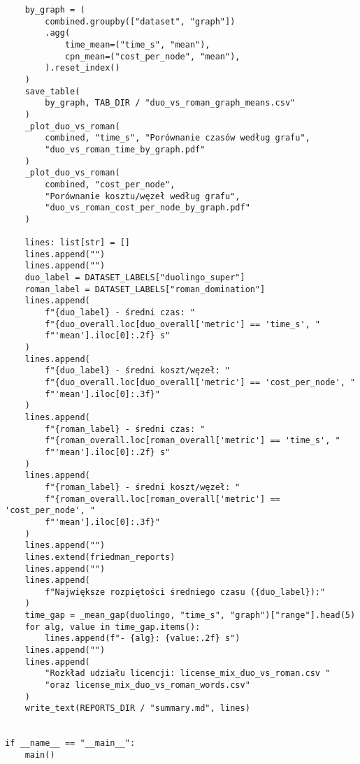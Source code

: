 {\begin{verbatim}
    by_graph = (
        combined.groupby(["dataset", "graph"])
        .agg(
            time_mean=("time_s", "mean"),
            cpn_mean=("cost_per_node", "mean"),
        ).reset_index()
    )
    save_table(
        by_graph, TAB_DIR / "duo_vs_roman_graph_means.csv"
    )
    _plot_duo_vs_roman(
        combined, "time_s", "Porównanie czasów według grafu",
        "duo_vs_roman_time_by_graph.pdf"
    )
    _plot_duo_vs_roman(
        combined, "cost_per_node",
        "Porównanie kosztu/węzeł według grafu",
        "duo_vs_roman_cost_per_node_by_graph.pdf"
    )

    lines: list[str] = []
    lines.append("")
    lines.append("")
    duo_label = DATASET_LABELS["duolingo_super"]
    roman_label = DATASET_LABELS["roman_domination"]
    lines.append(
        f"{duo_label} - średni czas: "
        f"{duo_overall.loc[duo_overall['metric'] == 'time_s', "
        f"'mean'].iloc[0]:.2f} s"
    )
    lines.append(
        f"{duo_label} - średni koszt/węzeł: "
        f"{duo_overall.loc[duo_overall['metric'] == 'cost_per_node', "
        f"'mean'].iloc[0]:.3f}"
    )
    lines.append(
        f"{roman_label} - średni czas: "
        f"{roman_overall.loc[roman_overall['metric'] == 'time_s', "
        f"'mean'].iloc[0]:.2f} s"
    )
    lines.append(
        f"{roman_label} - średni koszt/węzeł: "
        f"{roman_overall.loc[roman_overall['metric'] == 'cost_per_node', "
        f"'mean'].iloc[0]:.3f}"
    )
    lines.append("")
    lines.extend(friedman_reports)
    lines.append("")
    lines.append(
        f"Największe rozpiętości średniego czasu ({duo_label}):"
    )
    time_gap = _mean_gap(duolingo, "time_s", "graph")["range"].head(5)
    for alg, value in time_gap.items():
        lines.append(f"- {alg}: {value:.2f} s")
    lines.append("")
    lines.append(
        "Rozkład udziału licencji: license_mix_duo_vs_roman.csv "
        "oraz license_mix_duo_vs_roman_words.csv"
    )
    write_text(REPORTS_DIR / "summary.md", lines)


if __name__ == "__main__":
    main()
\end{verbatim}
    }
